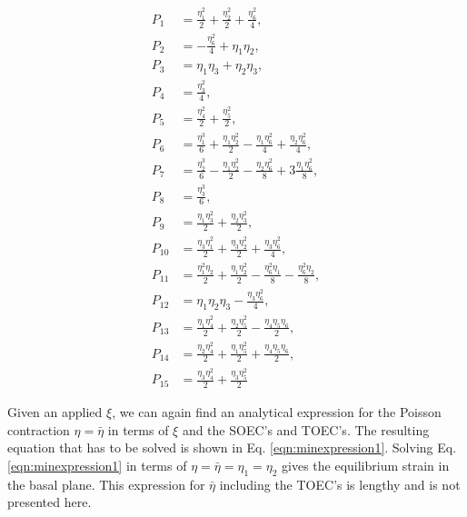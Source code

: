 \documentclass[showpacs,aps,floatfix,prb,reprint,superscriptaddress]{revtex4-1}
\begin{document}
\begin{subequations}
\label{eqn:expansion2detailed} 
\begin{align}
        P_{1} &=\frac{\eta_{1}^2}{2}  + \frac{\eta_{2}^2}{2} + \frac{\eta_{6}^2}{4} ,\\
        P_{2} &=-\frac{\eta_{6}^2}{4} + \eta_{1}\eta_{2} ,\\
				P_{3} &=\eta_{1}\eta_{3} + \eta_{2}\eta_{3} , \\
				P_{4} &=\frac{\eta_{3}^2}{4} , \\
				P_{5} &=\frac{\eta_{4}^2}{2} + \frac{\eta_{5}^2}{2} , \\
				P_{6} &=\frac{\eta_{1}^3}{6} + \frac{\eta_{1}\eta_{2}^2}{2} - \frac{\eta_{1}\eta_{6}^2}{4} + \frac{\eta_{2}\eta_{6}^2}{4} , \\
				P_{7} &=\frac{\eta_{2}^3}{6} - \frac{\eta_{1}\eta_{2}^2}{2} - \frac{\eta_{2}\eta_{6}^2}{8} + 3\frac{\eta_{1}\eta_{6}^2}{8} , \\
				P_{8} &=\frac{\eta_{3}^3}{6} , \\
				P_{9} &=\frac{\eta_{1}\eta_{3}^2}{2} + \frac{\eta_{2}\eta_{3}^2}{2} , \\
				P_{10} &=\frac{\eta_{3}\eta_{1}^2}{2} + \frac{\eta_{3}\eta_{2}^2}{2} + \frac{\eta_{3}\eta_{6}^2}{4} , \\
				P_{11} &=\frac{\eta_{1}^2\eta_{2}}{2} +  \frac{\eta_{1}\eta_{2}^2}{2} - \frac{\eta_{6}^2\eta_{1}}{8} - \frac{\eta_{6}^2\eta_{2}}{8} , \\
				P_{12} &=\eta_{1}\eta_{2}\eta_{3} - \frac{\eta_{3}\eta_{6}^2}{4} , \\
				P_{13} &=\frac{\eta_{1}\eta_{4}^2}{2} + \frac{\eta_{2}\eta_{5}^2}{2} - \frac{\eta_{4}\eta_{5}\eta_{6}}{2} , \\
				P_{14} &=\frac{\eta_{2}\eta_{4}^2}{2} + \frac{\eta_{1}\eta_{5}^2}{2} + \frac{\eta_{4}\eta_{5}\eta_{6}}{2} , \\
				P_{15} &=\frac{\eta_{3}\eta_{4}^2}{2} + \frac{\eta_{3}\eta_{5}^2}{2} 
\end{align}
\end{subequations}

Given an applied $\xi$, we can again find an analytical expression for the Poisson contraction $\eta = \bar{\eta}$ in terms of $\xi$ and the SOEC's and TOEC's. The resulting equation that has to be solved is shown in Eq. \ref{eqn:minexpression1}. Solving Eq. \ref{eqn:minexpression1} in terms of $\eta = \bar{\eta} = \eta_{1} = \eta_{2}$ gives the equilibrium strain in the basal plane. This expression for $\bar{\eta}$ including the TOEC's is lengthy and is not presented here.
\end{document}
